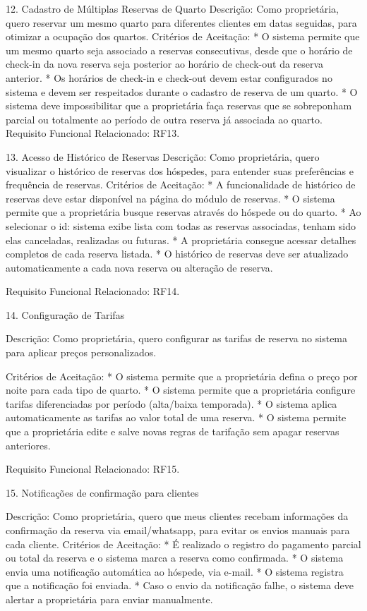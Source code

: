12. Cadastro de Múltiplas Reservas de Quarto
Descrição: Como proprietária, quero reservar um mesmo quarto para diferentes clientes em datas seguidas, para otimizar a ocupação dos quartos. 
Critérios de Aceitação:
* O sistema permite que um mesmo quarto seja associado a reservas consecutivas, desde que o horário de check-in da nova reserva seja posterior ao horário de check-out da reserva anterior.
* Os horários de check-in e check-out devem estar configurados no sistema e devem ser respeitados durante o cadastro de reserva de um quarto.
* O sistema deve impossibilitar que a proprietária faça reservas que se sobreponham parcial ou totalmente ao período de outra reserva já associada ao quarto.
Requisito Funcional Relacionado: RF13.


13. Acesso de Histórico de Reservas
Descrição: Como proprietária, quero visualizar o histórico de reservas dos hóspedes, para entender suas preferências e frequência de reservas.
Critérios de Aceitação:
* A funcionalidade de histórico de reservas  deve estar disponível na página do módulo de reservas.
* O sistema permite que a proprietária busque reservas através do hóspede ou do quarto.
* Ao selecionar o id: sistema exibe lista com todas as reservas associadas, tenham sido elas canceladas, realizadas ou futuras.
* A proprietária consegue acessar detalhes completos de cada reserva listada.
*  O histórico de reservas deve ser atualizado automaticamente a cada nova reserva ou alteração de reserva.


Requisito Funcional Relacionado: RF14.


14.  Configuração de Tarifas


Descrição: Como proprietária, quero configurar as tarifas de reserva no sistema para aplicar preços personalizados.


Critérios de Aceitação:
* O sistema permite que a proprietária defina o preço por noite para cada tipo de quarto.
* O sistema permite que a proprietária configure tarifas diferenciadas por período (alta/baixa temporada).
* O sistema aplica automaticamente as tarifas ao valor total de uma reserva.
*  O sistema permite que a proprietária edite e salve novas regras de tarifação sem apagar reservas anteriores.


Requisito Funcional Relacionado: RF15.


15. Notificações de confirmação para clientes


Descrição: Como proprietária, quero que meus clientes recebam informações da confirmação da reserva via email/whatsapp, para evitar os envios manuais para cada cliente. 
Critérios de Aceitação:
* É realizado o registro do pagamento parcial ou total da reserva e o sistema marca a reserva como confirmada.
* O sistema envia  uma notificação automática ao hóspede, via e-mail.
* O sistema registra que a notificação foi enviada.
* Caso o envio da notificação falhe, o sistema deve alertar a proprietária para enviar manualmente.


